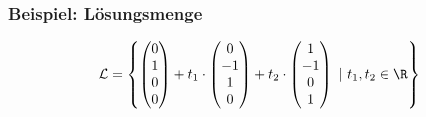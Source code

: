 %
%
\begin{frame}\frametitle{Beispiel: Lösungsmenge}

	$$
		{\mathcal L} =
		\left\{
					\begin{pmatrix}
						0\\
						1\\
						0\\
						0
					\end{pmatrix}
					+
					t_1
					\cdot
					\begin{pmatrix}
						0\\
						-1\\
						1\\
						0
					\end{pmatrix}
					+
					t_2
					\cdot
					\begin{pmatrix}
						1\\
						-1\\
						0\\
						1
					\end{pmatrix}	
					~|~
					t_1, t_2 \in \R
		\right\}
	$$

\end{frame}
%
%

